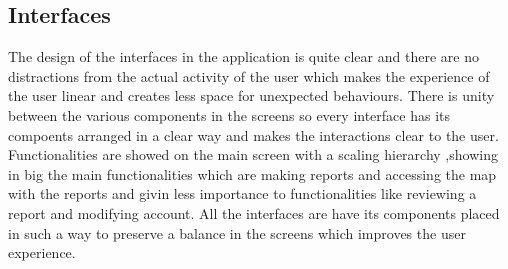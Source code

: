 \subsection{Interfaces}
The design of the interfaces in the application is quite clear and there are no distractions from the actual activity of the user which makes the experience of the user linear and creates less space for unexpected behaviours. 
\newline
There is unity between the various components in the screens so every interface has its compoents arranged in a clear way and makes the interactions clear to the user.
\newline
Functionalities are showed on the main screen with a scaling hierarchy ,showing in big the main functionalities which are making reports and accessing the map with the reports and givin less importance to functionalities like reviewing a report and modifying account.
\newline
All the interfaces are have its components placed in such a way to preserve a balance in the screens which improves the user experience.

